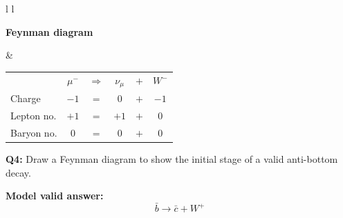 \documentclass[12pt]{article}
\begin{document}
\begin{tabular}{l l}

\begin{minipage}[t]{0.46\textwidth}
\vspace{0pt}
\textbf{Feynman diagram}

\vspace{0.6cm}

\begin{tikzpicture}
\begin{feynman}
  \vertex (l1) at (0,0) {\(\mu^-\)};
  \vertex [coordinate] (a) at (1,2) {};
  \vertex (l2) at (0,4) {\(\nu_\mu\)};
  \vertex (b) at (4,2) {};

  \diagram*{
    (l1) -- [fermion] (a) -- [fermion] (l2),
    (a) -- [boson, edge label=\(W^-\), momentum'={}] (b),
  };
\end{feynman}
\end{tikzpicture}
\end{minipage}
&
\begin{minipage}[t]{0.50\textwidth}
\vspace{0pt}

\renewcommand{\arraystretch}{1.4}
\begin{tabular}{@{}l c c c c c@{}}
 & \(\mu^-\) & \(\Rightarrow\) & \(\nu_\mu\) & \(+\) & \(W^-\) \\
Charge & \(-1\) & \(=\) & \(0\) & \(+\) & \(-1\) \\
Lepton no. & \(+1\) & \(=\) & \(+1\) & \(+\) & \(0\) \\
Baryon no. & \(0\) & \(=\) & \(0\) & \(+\) & \(0\) \\
\end{tabular}

\end{minipage}

\end{tabular}

\vspace{1.0cm}

\newpage
\textbf{Q4:} Draw a Feynman diagram to show the initial stage of a valid anti-bottom decay.

\vspace{0.3cm}
\textbf{Model valid answer:}
\[
\boxed{\bar{b} \rightarrow \bar{c} + W^+}
\]

\vspace{0.4cm}
\end{document}
